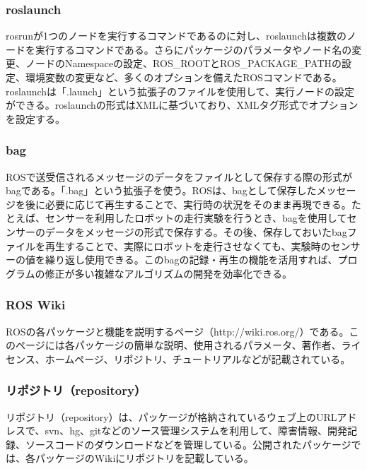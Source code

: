 \subsubsection{roslaunch}
rosrunが1つのノードを実行するコマンドであるのに対し、roslaunchは複数のノードを実行するコマンドである。さらにパッケージのパラメータやノード名の変更、ノードのNamespaceの設定、ROS\_ROOTとROS\_PACKAGE\_PATHの設定、環境変数の変更など、多くのオプションを備えたROSコマンドである。roslaunchは「.launch」という拡張子のファイルを使用して、実行ノードの設定ができる。roslaunchの形式はXMLに基づいており、XMLタグ形式でオプションを設定する。

\subsubsection{bag}
ROSで送受信されるメッセージのデータをファイルとして保存する際の形式がbagである。「.bag」という拡張子を使う。ROSは、bagとして保存したメッセージを後に必要に応じて再生することで、実行時の状況をそのまま再現できる。たとえば、センサーを利用したロボットの走行実験を行うとき、bagを使用してセンサーのデータをメッセージの形式で保存する。その後、保存しておいたbagファイルを再生することで、実際にロボットを走行させなくても、実験時のセンサーの値を繰り返し使用できる。このbagの記録・再生の機能を活用すれば、プログラムの修正が多い複雑なアルゴリズムの開発を効率化できる。

\subsubsection{ROS Wiki}
ROSの各パッケージと機能を説明するページ（http://wiki.ros.org/）である。このページには各パッケージの簡単な説明、使用されるパラメータ、著作者、ライセンス、ホームページ、リポジトリ、チュートリアルなどが記載されている。

\subsubsection{リポジトリ（repository）}
リポジトリ（repository）は、パッケージが格納されているウェブ上のURLアドレスで、svn、hg、gitなどのソース管理システムを利用して、障害情報、開発記録、ソースコードのダウンロードなどを管理している。公開されたパッケージでは、各パッケージのWikiにリポジトリを記載している。

